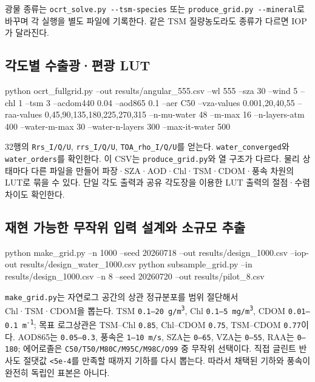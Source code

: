 광물 종류는 \texttt{ocrt\_\allowbreak{}solve.\allowbreak{}py -\allowbreak{}-\allowbreak{}tsm-\allowbreak{}species} 또는 \texttt{produce\_\allowbreak{}grid.\allowbreak{}py -\allowbreak{}-\allowbreak{}mineral}로 바꾸며 각 실행을 별도 파일에 기록한다. 같은 TSM 질량농도라도 종류가 다르면 IOP가 달라진다.

\subsection{각도별 수출광·편광 LUT}
\label{sec:auto:06_python_batch:7.5}

\begin{ManualCode}
python ocrt_fullgrid.py --out results/angular_555.csv --wl 555 --sza 30 --wind 5 --chl 1 --tsm 3 --acdom440 0.04 --aod865 0.1 --aer C50 --vza-values 0.001,20,40,55 --raa-values 0,45,90,135,180,225,270,315 --n-mu-water 48 --m-max 16 --n-layers-atm 400 --water-m-max 30 --water-n-layers 300 --max-it-water 500
\end{ManualCode}

32행의 \texttt{Rrs\_\allowbreak{}I/\allowbreak{}Q/\allowbreak{}U}, \texttt{rrs\_\allowbreak{}I/\allowbreak{}Q/\allowbreak{}U}, \texttt{TOA\_\allowbreak{}rho\_\allowbreak{}I/\allowbreak{}Q/\allowbreak{}U}를 얻는다. \texttt{water\_\allowbreak{}converged}와 \texttt{water\_\allowbreak{}orders}를 확인한다. 이 CSV는 \texttt{produce\_\allowbreak{}grid.\allowbreak{}py}와 열 구조가 다르다. 물리 상태마다 다른 파일을 만들어 파장·SZA·AOD·Chl·TSM·CDOM·풍속 차원의 LUT로 묶을 수 있다. 단일 각도 출력과 공유 각도장을 이용한 LUT 출력의 절점·수렴 차이도 확인한다.

\subsection{재현 가능한 무작위 입력 설계와 소규모 추출}
\label{sec:auto:06_python_batch:7.6}

\begin{ManualCode}
python make_grid.py --n 1000 --seed 20260718 --out results/design_1000.csv --iop-out results/design_water_1000.csv
python subsample_grid.py --in results/design_1000.csv --n 8 --seed 20260720 --out results/pilot_8.csv
\end{ManualCode}

\texttt{make\_\allowbreak{}grid.\allowbreak{}py}는 자연로그 공간의 상관 정규분포를 범위 절단해서 Chl·TSM·CDOM을 뽑는다. TSM \texttt{0.\allowbreak{}1--20 g/\allowbreak{}m\textsuperscript{3}}, Chl \texttt{0.\allowbreak{}1--5 mg/\allowbreak{}m\textsuperscript{3}}, CDOM \texttt{0.\allowbreak{}01--0.\allowbreak{}1 m\textsuperscript{-}\textsuperscript{1}}; 목표 로그상관은 TSM--Chl \texttt{0.\allowbreak{}85}, Chl--CDOM \texttt{0.\allowbreak{}75}, TSM--CDOM \texttt{0.\allowbreak{}77}이다. AOD865는 \texttt{0.\allowbreak{}05--0.\allowbreak{}3}, 풍속은 \texttt{1--10 m/\allowbreak{}s}, SZA는 \texttt{0--65\textdegree{}}, VZA는 \texttt{0--55\textdegree{}}, RAA는 \texttt{0--180\textdegree{}}; 에어로졸은 \texttt{C50/\allowbreak{}T50/\allowbreak{}M80C/\allowbreak{}M95C/\allowbreak{}M98C/\allowbreak{}O99} 중 무작위 선택이다. 직접 글린트 반사도 절댓값 \texttt{<5e-\allowbreak{}4}를 만족할 때까지 기하를 다시 뽑는다. 따라서 채택된 기하와 풍속이 완전히 독립인 표본은 아니다.

